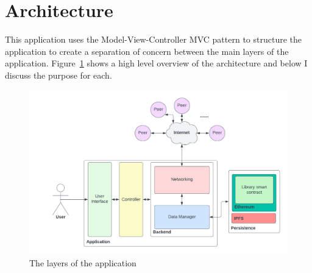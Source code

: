 \section{Architecture}

This application uses the Model-View-Controller MVC pattern to structure the application to create a separation of concern between the main layers of the application. Figure~\ref{fig:impl-layers} shows a high level overview of the architecture and below I discuss the purpose for each.

\begin{figure}[ht]
  \centering
  \includegraphics[width=.8\textwidth]{assets/images/diagrams/layers.png}
  \caption{The layers of the application}
  \label{fig:impl-layers}
\end{figure}





